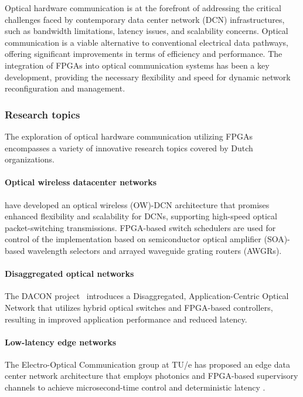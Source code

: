 Optical hardware communication is at the forefront of addressing the critical challenges faced by contemporary data center network (DCN) infrastructures, such as bandwidth limitations, latency issues, and scalability concerns. Optical communication is a viable alternative to conventional electrical data pathways, offering significant improvements in terms of efficiency and performance. The integration of FPGAs into optical communication systems has been a key development, providing the necessary flexibility and speed for dynamic network reconfiguration and management.

\subsubsection*{\bf{Research topics}}
The exploration of optical hardware communication utilizing FPGAs encompasses a variety of innovative research topics covered by Dutch organizations.
\paragraph{Optical wireless datacenter networks}
\citet{Zhang2022Low-LatencyRouter} have developed an optical wireless (OW)-DCN architecture that promises enhanced flexibility and scalability for DCNs, supporting high-speed optical packet-switching transmissions. FPGA-based switch schedulers are used for control of the implementation based on semiconductor optical amplifier (SOA)-based wavelength selectors and arrayed waveguide grating routers (AWGRs).

\paragraph{Disaggregated optical networks}
The DACON project~\cite{Guo2022DACON:Invited} introduces a Disaggregated, Application-Centric Optical Network that utilizes hybrid optical switches and FPGA-based controllers, resulting in improved application performance and reduced latency.

\paragraph{Low-latency edge networks}
The Electro-Optical Communication group at TU/e has proposed an edge data center network architecture that employs photonics and FPGA-based supervisory channels to achieve microsecond-time control and deterministic latency \cite{Santana2023SOA-BasedApplications}.

